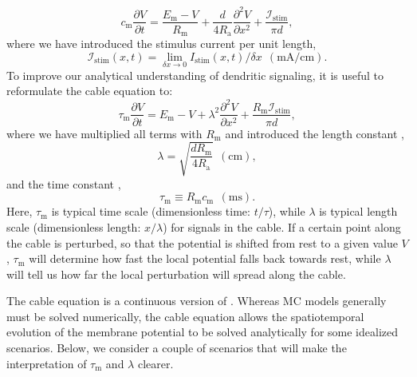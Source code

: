 \begin{equation}
c_\text{m} \frac{\partial V}{\partial t} = \frac{E_\text{m}-V}{R_\text{m}} +  \frac{d}{4 R_\text{a}}  \frac{\partial^2 V}{\partial x^2}  + \frac{\mathcal{I}_{\mathrm{stim}}}{\pi d},
\label{eq:Neuron:cable}
\end{equation}
where we have introduced the stimulus current per unit length,
\begin{equation}
\mathcal{I}_{\mathrm{stim}}(x,t) = \lim_{\delta x \to 0} I_{\mathrm{stim}}(x,t)/\delta x \,\; (\si{\milli\ampere\per\centi\metre}). 
\label{eq:Neuron:CurrentPerUnitLength}
\end{equation}
To improve our analytical understanding of dendritic signaling, it is useful to reformulate the cable equation to:
\begin{equation}
\tau_\text{m} \frac{\partial V}{\partial t} = E_\text{m}-V +   \lambda^2  \frac{\partial^2 V}{\partial x^2}  + \frac{R_\text{m} \mathcal{I}_{\mathrm{stim}} }{\pi d},
\label{eq:Neuron:cable2}
\end{equation}
where we have multiplied all terms with $R_\text{m}$ and introduced the length constant ,
\begin{equation}
\lambda = \sqrt{\frac{d R_\text{m}}{4 R_\text{a}}} \,\; (\si{\centi\metre}), 
\label{eq:Neuron:lengthconst}
\end{equation}
and the time constant , 
\begin{equation}
\tau_\text{m} \equiv R_\text{m} c_\text{m}  \,\; (\si{\milli\second}).
\label{eq:Neuron:timeconst}
\end{equation}
Here, $\tau_\text{m}$ is typical time scale (dimensionless time: $t/\tau$), while $\lambda$  is typical length scale  (dimensionless length: $x/\lambda$) for signals in the cable. If a certain point along the cable is perturbed, so that the potential is shifted from rest to a given value $V$, $\tau_\text{m}$ will determine how fast the local potential falls back towards rest, while $\lambda$ will tell us how far the local perturbation will spread along the cable. 

The cable equation is a continuous version of . Whereas MC models generally must be solved numerically, the cable equation allows the spatiotemporal evolution of the membrane potential to be solved analytically for some idealized scenarios. Below, we consider a couple of scenarios that will  make the interpretation of $\tau_\text{m}$ and $\lambda$ clearer. 


